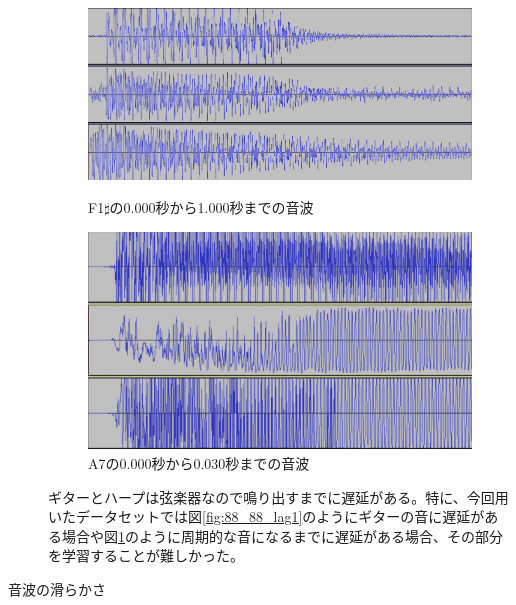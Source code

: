 \begin{description}
\begin{figure}[t]
\begin{center}
\begin{minipage}{0.48\hsize}
\begin{center}
\includegraphics[width=0.9\hsize]{figure/88_88/f1s.png}
\caption{F1$\sharp$の0.000秒から1.000秒までの音波}
\label{fig:88_88_lag1}
\end{center}
\end{minipage}
\begin{minipage}{0.48\hsize}
\begin{center}
\includegraphics[width=0.9\hsize]{figure/88_88_det/a7_0_0030.png}
\caption{A7の0.000秒から0.030秒までの音波}
\label{fig:88_88_lag2}
\end{center}
\end{minipage}
\end{center}
\end{figure}

ギターとハープは弦楽器なので鳴り出すまでに遅延がある。特に、今回用いたデータセットでは図\ref{fig:88_88_lag1}のようにギターの音に遅延がある場合や図\ref{fig:88_88_lag2}のように周期的な音になるまでに遅延がある場合、その部分を学習することが難しかった。

\item[音波の滑らかさ]\mbox{}


\end{description}
